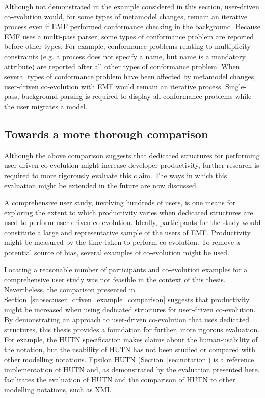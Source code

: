 Although not demonstrated in the example considered in this section, user-driven co-evolution would, for some types of metamodel changes, remain an iterative process even if EMF performed conformance checking in the background. Because EMF uses a multi-pass parser, some types of conformance problem are reported before other types. For example, conformance problems relating to multiplicity constraints (e.g. a process does not specify a name, but name is a mandatory attribute) are reported after all other types of conformance problem. When several types of conformance problem have been affected by metamodel changes, user-driven co-evolution with EMF would remain an iterative process. Single-pass, background parsing is required to display all conformance problems while the user migrates a model.

\subsection{Towards a more thorough comparison}
\label{subsec:user_driven_further_work}
Although the above comparison suggests that dedicated structures for performing user-driven co-evolution might increase developer productivity, further research is required to more rigorously evaluate this claim. The ways in which this evaluation might be extended in the future are now discussed.

A comprehensive user study, involving hundreds of users, is one means for exploring the extent to which productivity varies when dedicated structures are used to perform user-driven co-evolution. Ideally, participants for the study would constitute a large and representative sample of the users of EMF. Productivity might be measured by the time taken to perform co-evolution. To remove a potential source of bias, several examples of co-evolution might be used.



Locating a reasonable number of participants and co-evolution examples for a comprehensive user study was not feasible in the context of this thesis. Nevertheless, the comparison presented in Section~\ref{subsec:user_driven_example_comparison} suggests that productivity might be increased when using dedicated structures for user-driven co-evolution. By demonstrating an approach to user-driven co-evolution that uses dedicated structures, this thesis provides a foundation for further, more rigorous evaluation. For example, the HUTN specification \cite{hutn} makes claims about the human-usability of the notation, but the usability of HUTN has not been studied or compared with other modelling notations. Epsilon HUTN (Section~\ref{sec:notation}) is a reference implementation of HUTN and, as demonstrated by the evaluation presented here, facilitates the evaluation of HUTN and the comparison of HUTN to other modelling notations, such as XMI.


